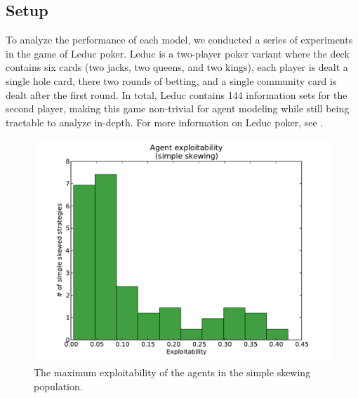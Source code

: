 \documentclass{aamas2013}
\begin{document}
    \subsection{Setup}
    To analyze the performance of each model, we conducted a series of experiments in the game of Leduc poker. Leduc is a two-player poker variant where the deck contains six cards (two jacks, two queens, and two kings), each player is dealt a single hole card, there two rounds of betting, and a single community card is dealt after the first round. In total, Leduc contains 144 information sets for the second player, making this game non-trivial for agent modeling while still being tractable to analyze in-depth. For more information on Leduc poker, see \cite{bayesbluff}.

    \begin{figure}[thb]
      \centering
        \includegraphics[scale=.45]{exploitability_simple.pdf}
      \caption{The maximum exploitability of the agents in the simple skewing population.}
      \label{fig-exploitability-simple}
    \end{figure}
\end{document}
